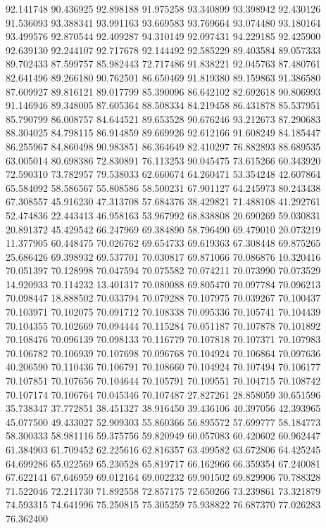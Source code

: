 92.141748
90.436925
92.898188
91.975258
93.340899
93.398942
92.430126
91.536093
93.388341
93.991163
93.669583
93.769664
93.074480
93.180164
93.499576
92.870544
92.409287
94.310149
92.097431
94.229185
92.425900
92.639130
92.244107
92.717678
92.144492
92.585229
89.403584
89.057333
89.702433
87.599757
85.982443
72.717486
91.838221
92.045763
87.480761
82.641496
89.266180
90.762501
86.650469
91.819380
89.159863
91.386580
87.609927
89.816121
89.017799
85.390096
86.642102
82.692618
90.806993
91.146946
89.348005
87.605364
88.508334
84.219458
86.431878
85.537951
85.790799
86.008757
84.644521
89.653528
90.676246
93.212673
87.290683
88.304025
84.798115
86.914859
89.669926
92.612166
91.608249
84.185447
86.255967
84.860498
90.983851
86.364649
82.410297
76.882893
88.689535
63.005014
80.698386
72.830891
76.113253
90.045475
73.615266
60.343920
72.590310
73.782957
79.538033
62.660674
64.260471
53.354248
42.607864
65.584092
58.586567
55.808586
58.500231
67.901127
64.245973
80.243438
67.308557
45.916230
47.313708
57.684376
38.429821
71.488108
41.292761
52.474836
22.443413
46.958163
53.967992
68.838808
20.690269
59.030831
20.891372
45.429542
66.247969
69.384890
58.796490
69.479010
20.073219
11.377905
60.448475
70.026762
69.654733
69.619363
67.308448
69.875265
25.686426
69.398932
69.537701
70.030817
69.871066
70.086876
10.320416
70.051397
70.128998
70.047594
70.075582
70.074211
70.073990
70.073529
14.920933
70.114232
13.401317
70.080088
69.805470
70.097784
70.096213
70.098447
18.888502
70.033794
70.079288
70.107975
70.039267
70.100437
70.103971
70.102075
70.091712
70.108338
70.095336
70.105741
70.104439
70.104355
70.102669
70.094444
70.115284
70.051187
70.107878
70.101892
70.108476
70.096139
70.098133
70.116779
70.107818
70.107371
70.107983
70.106782
70.106939
70.107698
70.096768
70.104924
70.106864
70.097636
40.206590
70.110436
70.106791
70.108660
70.104924
70.107494
70.106177
70.107851
70.107656
70.104644
70.105791
70.109551
70.104715
70.108742
70.107174
70.106764
70.045346
70.107487
27.827261
28.858059
30.651596
35.738347
37.772851
38.451327
38.916450
39.436106
40.397056
42.393965
45.077500
49.433027
52.909303
55.860366
56.895572
57.699777
58.184773
58.300333
58.981116
59.375756
59.820949
60.057083
60.420602
60.962447
61.384903
61.709452
62.225616
62.816357
63.499582
63.672806
64.425245
64.699286
65.022569
65.230528
65.819717
66.162966
66.359354
67.240081
67.622141
67.646959
69.012164
69.002232
69.901502
69.829906
70.788328
71.522046
72.211730
71.892558
72.857175
72.650266
73.239861
73.321879
74.593315
74.641996
75.250815
75.305259
75.938822
76.687370
77.026283
76.362400
